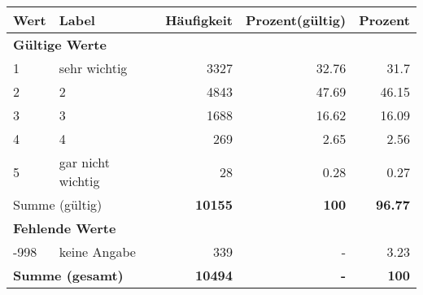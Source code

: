      \begin{longtable}{lXrrr}
     \toprule
     \textbf{Wert} & \textbf{Label} & \textbf{Häufigkeit} & \textbf{Prozent(gültig)} & \textbf{Prozent} \\
     \endhead
     \midrule
     \multicolumn{5}{l}{\textbf{Gültige Werte}}\\

     1 &
     \multicolumn{1}{X}{ sehr wichtig   } &


       \num{3327} &
       \num[round-mode=places,round-precision=2]{32.76} &
         \num[round-mode=places,round-precision=2]{31.7} \\

     2 &
     \multicolumn{1}{X}{ 2   } &


       \num{4843} &
       \num[round-mode=places,round-precision=2]{47.69} &
         \num[round-mode=places,round-precision=2]{46.15} \\

     3 &
     \multicolumn{1}{X}{ 3   } &


       \num{1688} &
       \num[round-mode=places,round-precision=2]{16.62} &
         \num[round-mode=places,round-precision=2]{16.09} \\

     4 &
     \multicolumn{1}{X}{ 4   } &


       \num{269} &
       \num[round-mode=places,round-precision=2]{2.65} &
         \num[round-mode=places,round-precision=2]{2.56} \\

     5 &
     \multicolumn{1}{X}{ gar nicht wichtig   } &


       \num{28} &
       \num[round-mode=places,round-precision=2]{0.28} &
         \num[round-mode=places,round-precision=2]{0.27} \\
     \midrule
     \multicolumn{2}{l}{Summe (gültig)} &
       \textbf{\num{10155}} &
     \textbf{\num{100}} &
       \textbf{\num[round-mode=places,round-precision=2]{96.77}} \\
     \multicolumn{5}{l}{\textbf{Fehlende Werte}}\\
       -998 &
       keine Angabe &
         \num{339} &
        - &
         \num[round-mode=places,round-precision=2]{3.23} \\
     \midrule
     \multicolumn{2}{l}{\textbf{Summe (gesamt)}} &
          \textbf{\num{10494}} &
        \textbf{-} &
        \textbf{\num{100}} \\
     \bottomrule
     \end{longtable}
     
